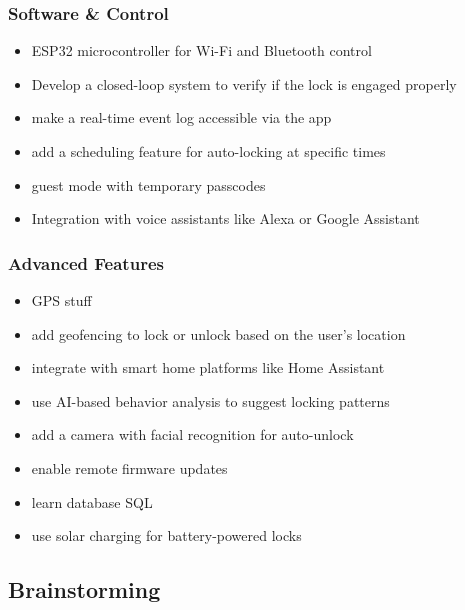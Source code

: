 \subsubsection*{Software \& Control}
\begin{itemize}
    \item ESP32 microcontroller for Wi-Fi and Bluetooth control
    \item Develop a closed-loop system to verify if the lock is engaged properly
    \item make a real-time event log accessible via the app
    \item add a scheduling feature for auto-locking at specific times
    \item guest mode with temporary passcodes
    \item Integration with voice assistants like Alexa or Google Assistant
\end{itemize}

\subsubsection*{Advanced Features}
\begin{itemize}
    \item GPS stuff
    \item add geofencing to lock or unlock based on the user's location
    \item integrate with smart home platforms like Home Assistant
    \item use AI-based behavior analysis to suggest locking patterns
    \item add a camera with facial recognition for auto-unlock
    \item enable remote firmware updates
    \item learn database SQL
    \item use solar charging for battery-powered locks
\end{itemize}







\subsection{Brainstorming}

